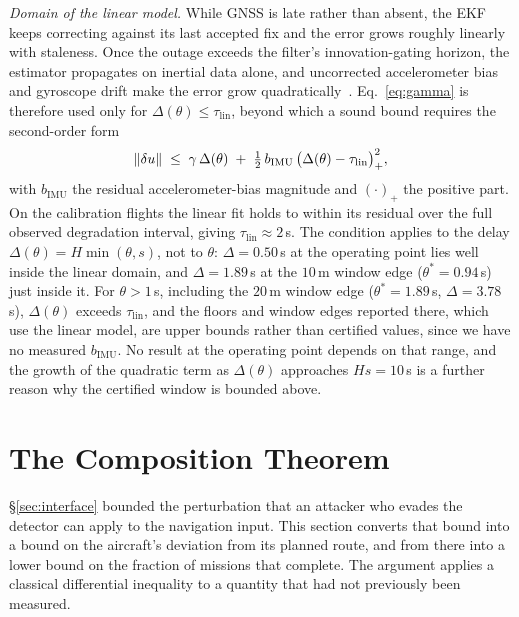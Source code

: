 \emph{Domain of the linear model.} While GNSS is late rather than absent, the
EKF keeps correcting against its last accepted fix and the error grows roughly
linearly with staleness. Once the outage exceeds the filter's innovation-gating
horizon, the estimator propagates on inertial data alone, and uncorrected
accelerometer bias and gyroscope drift make the error grow
quadratically~\cite{kong2024px4ekf}. Eq.~\eqref{eq:gamma} is therefore used
only for $\Delta(\theta)\le\tau_{\mathrm{lin}}$, beyond which a sound bound
requires the second-order form
\begin{equation}
\label{eq:gamma_quad}
\left\lVert \delta u\right\rVert\;\le\;\gamma\,\Delta(\theta)\;+\;\tfrac12\,b_{\mathrm{IMU}}\,\big(\Delta(\theta)-\tau_{\mathrm{lin}}\big)_{+}^{2},
\end{equation}
with $b_{\mathrm{IMU}}$ the residual accelerometer-bias magnitude and
$(\cdot)_+$ the positive part. On the calibration flights the linear fit holds
to within its residual over the full observed degradation interval, giving
$\tau_{\mathrm{lin}}\approx2$\,s. The condition applies to the delay
$\Delta(\theta)=H\min(\theta,s)$, not to $\theta$: $\Delta=0.50$\,s at the
operating point lies well inside the linear domain, and $\Delta=1.89$\,s at the
$10$\,m window edge ($\theta^{*}=0.94$\,s) just inside it. For $\theta>1$\,s,
including the $20$\,m window edge ($\theta^{*}=1.89$\,s, $\Delta=3.78$\,s),
$\Delta(\theta)$ exceeds $\tau_{\mathrm{lin}}$, and the floors and window edges
reported there, which use the linear model, are upper bounds rather than
certified values, since we have no measured $b_{\mathrm{IMU}}$. No result at the
operating point depends on that range, and the growth of the quadratic term as
$\Delta(\theta)$ approaches $Hs=10$\,s is a further reason why the certified
window is bounded above.

\section{The Composition Theorem}
\label{sec:theorem}
\S\ref{sec:interface} bounded the perturbation that an attacker who evades the
detector can apply to the navigation input. This section converts that bound
into a bound on the aircraft's deviation from its planned route, and from there
into a lower bound on the fraction of missions that complete. The argument
applies a classical differential inequality to a quantity that had not
previously been measured.

